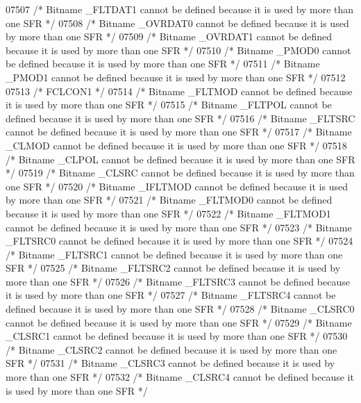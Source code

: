 \begin{DoxyCode}
07507 \textcolor{comment}{/* Bitname \_FLTDAT1 cannot be defined because it is used by more than one SFR */}
07508 \textcolor{comment}{/* Bitname \_OVRDAT0 cannot be defined because it is used by more than one SFR */}
07509 \textcolor{comment}{/* Bitname \_OVRDAT1 cannot be defined because it is used by more than one SFR */}
07510 \textcolor{comment}{/* Bitname \_PMOD0 cannot be defined because it is used by more than one SFR */}
07511 \textcolor{comment}{/* Bitname \_PMOD1 cannot be defined because it is used by more than one SFR */}
07512 
07513 \textcolor{comment}{/* FCLCON1 */}
07514 \textcolor{comment}{/* Bitname \_FLTMOD cannot be defined because it is used by more than one SFR */}
07515 \textcolor{comment}{/* Bitname \_FLTPOL cannot be defined because it is used by more than one SFR */}
07516 \textcolor{comment}{/* Bitname \_FLTSRC cannot be defined because it is used by more than one SFR */}
07517 \textcolor{comment}{/* Bitname \_CLMOD cannot be defined because it is used by more than one SFR */}
07518 \textcolor{comment}{/* Bitname \_CLPOL cannot be defined because it is used by more than one SFR */}
07519 \textcolor{comment}{/* Bitname \_CLSRC cannot be defined because it is used by more than one SFR */}
07520 \textcolor{comment}{/* Bitname \_IFLTMOD cannot be defined because it is used by more than one SFR */}
07521 \textcolor{comment}{/* Bitname \_FLTMOD0 cannot be defined because it is used by more than one SFR */}
07522 \textcolor{comment}{/* Bitname \_FLTMOD1 cannot be defined because it is used by more than one SFR */}
07523 \textcolor{comment}{/* Bitname \_FLTSRC0 cannot be defined because it is used by more than one SFR */}
07524 \textcolor{comment}{/* Bitname \_FLTSRC1 cannot be defined because it is used by more than one SFR */}
07525 \textcolor{comment}{/* Bitname \_FLTSRC2 cannot be defined because it is used by more than one SFR */}
07526 \textcolor{comment}{/* Bitname \_FLTSRC3 cannot be defined because it is used by more than one SFR */}
07527 \textcolor{comment}{/* Bitname \_FLTSRC4 cannot be defined because it is used by more than one SFR */}
07528 \textcolor{comment}{/* Bitname \_CLSRC0 cannot be defined because it is used by more than one SFR */}
07529 \textcolor{comment}{/* Bitname \_CLSRC1 cannot be defined because it is used by more than one SFR */}
07530 \textcolor{comment}{/* Bitname \_CLSRC2 cannot be defined because it is used by more than one SFR */}
07531 \textcolor{comment}{/* Bitname \_CLSRC3 cannot be defined because it is used by more than one SFR */}
07532 \textcolor{comment}{/* Bitname \_CLSRC4 cannot be defined because it is used by more than one SFR */}

\end{DoxyCode}
